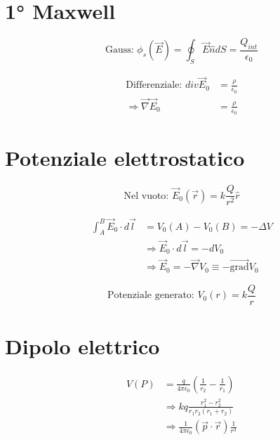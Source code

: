 \documentclass[a4paper,11pt]{article}
\begin{document}
\begin{multicols}{3}
		
		\section{1° Maxwell}
		
		\begin{equation}
			\text{Gauss: } \phi_{s}\left(\vec{E}\right) = \oint_S\vec{E}\hat{n}dS=\frac{Q_{int}}{\epsilon_{0}}
		\end{equation}
		
		\begin{align*}
			\text{Differenziale: } div\vec{E}_{0} &= \frac{\rho}{\epsilon_{0}} \\
			\Rightarrow \vec{\nabla}\vec{E}_{0} &= \frac{\rho}{\epsilon_{0}}
		\end{align*}
		
		
		
		
		
		\section{Potenziale elettrostatico}
		
		\begin{equation}
			\text{Nel vuoto: } \vec{E}_{0}\left(\vec{r}\right) = k\frac{Q}{r^{2}}\hat{r}
		\end{equation}
		
		\begin{align*}
			\int_{A}^{B} \vec{E}_{0} \cdot d\vec{l} &= V_0(A) - V_0(B) = -\Delta V \\
			&\Rightarrow \vec{E}_{0} \cdot d\vec{l} = -dV_{0} \\
			&\Rightarrow \vec{E}_0 = -\vec{\nabla} V_0 \equiv -\vec{\mathrm{grad}} V_0
		\end{align*}
		
		\begin{equation}
			\text{Potenziale generato: } V_0(r) = k\frac{Q}{r}
		\end{equation}
		
		
		\section{Dipolo elettrico}
		
		\begin{align*}
			V(P) &= \frac{q}{4\pi\epsilon_0}\left(\frac{1}{r_2}-\frac{1}{r_1}\right) \\
			&\Rightarrow kq\frac{r_1^2-r_2^2}{r_1r_2\left(r_1+r_2\right)} \\
			&\Rightarrow \frac{1}{4\pi\epsilon_0}\left(\vec{p}\cdot\vec{r}\right)\frac{1}{r^3}
		\end{align*}
		

\end{multicols}
\end{document}
